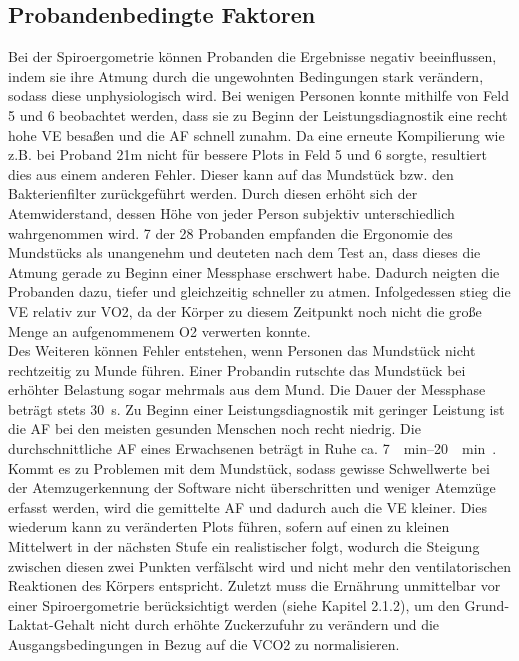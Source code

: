 \subsection{Probandenbedingte Faktoren}
%
Bei der Spiroergometrie können Probanden die Ergebnisse negativ beeinflussen, indem sie ihre Atmung durch die ungewohnten Bedingungen stark verändern, sodass diese unphysiologisch wird. Bei wenigen Personen konnte mithilfe von Feld 5 und 6 beobachtet werden, dass sie zu Beginn der Leistungsdiagnostik eine recht hohe \gls{VE} besaßen und die \gls{AF} schnell zunahm. Da eine erneute Kompilierung wie z.B. bei Proband 21m nicht für bessere Plots in Feld 5 und 6 sorgte, resultiert dies aus einem anderen Fehler. Dieser kann auf das Mundstück bzw. den Bakterienfilter zurückgeführt werden. Durch diesen erhöht sich der Atemwiderstand, dessen Höhe von jeder Person subjektiv unterschiedlich wahrgenommen wird. 7 der 28 Probanden empfanden die Ergonomie des Mundstücks als unangenehm und deuteten nach dem Test an, dass dieses die Atmung gerade zu Beginn einer Messphase erschwert habe. Dadurch neigten die Probanden dazu, tiefer und gleichzeitig schneller zu atmen. Infolgedessen stieg die \gls{VE} relativ zur \gls{VO2}, da der Körper zu diesem Zeitpunkt noch nicht die große Menge an aufgenommenem \gls{O2} verwerten konnte.\\
Des Weiteren können Fehler entstehen, wenn Personen das Mundstück nicht rechtzeitig zu Munde führen. Einer Probandin rutschte das Mundstück bei erhöhter Belastung sogar mehrmals aus dem Mund. Die Dauer der Messphase beträgt stets \SI{30}{\second}. Zu Beginn einer Leistungsdiagnostik mit geringer Leistung ist die \gls{AF} bei den meisten gesunden Menschen noch recht niedrig. Die durchschnittliche \gls{AF} eines Erwachsenen beträgt in Ruhe ca. \SIrange{7}{20}{\per\minute}~\cite{Larsen.2017}. Kommt es zu Problemen mit dem Mundstück, sodass gewisse Schwellwerte bei der Atemzugerkennung der Software nicht überschritten und weniger Atemzüge erfasst werden, wird die gemittelte \gls{AF} und dadurch auch die \gls{VE} kleiner. Dies wiederum kann zu veränderten Plots führen, sofern auf einen zu kleinen Mittelwert in der nächsten Stufe ein realistischer folgt, wodurch die Steigung zwischen diesen zwei Punkten verfälscht wird und nicht mehr den ventilatorischen Reaktionen des Körpers entspricht. Zuletzt muss die Ernährung unmittelbar vor einer Spiroergometrie berücksichtigt werden (siehe Kapitel 2.1.2), um den Grund-Laktat-Gehalt nicht durch erhöhte Zuckerzufuhr zu verändern und die Ausgangsbedingungen in Bezug auf die \gls{VCO2} zu normalisieren.
%
